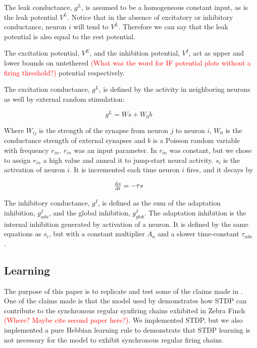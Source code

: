 \documentclass[12pt, final]{article}
\begin{document}
The leak conductance, \(g^L\), is assumed to be a homogeneous constant input, as is the leak potential \(V^L\). Notice that in the absence of excitatory or inhibitory conductance, neuron \(i\) will tend to \(V^L\). Therefore we can say that the leak potential is also equal to the rest potential.

The excitation potential, \(V^E\), and the inhibition potential, \(V^I\), act as upper and lower bounds on untethered \textcolor{red}{(What was the word for IF potential plots without a firing threshold?)} potential respectively. 

The excitation conductance, \(g^L\), is defined by the activity in neighboring neurons as well by external random stimulation:

\[g^L = Ws + W_0b\]

Where \(W_{ij}\) is the strength of the synapse from neuron \(j\) to neuron \(i\), \(W_0\) is the conductance strength of external synapses and \(b\) is a Poisson random variable with frequency \(r_{in}\). \(r_{in}\) was an input parameter. In \cite{Fiete} \(r_{in}\) was constant, but we chose to assign \(r_{in}\) a high value and anneal it to jump-start neural activity. \(s_i\) is the activation of neuron \(i\). It is incremented each time neuron \(i\) fires, and it decays by

\[\od{s}{t} = -\tau s\]

The inhibitory conductance, \(g^I\), is defined as the sum of the adaptation inhibition, \(g^I_{ada}\), and the global inhibition, \(g^I_{glob}\). The adaptation inhibition is the internal inhibition generated by activation of a neuron. It is defined by the same equations as \(s_i\), but with a constant multiplier \(A_a\) and a slower time-constant \(\tau_{ada}\).

\subsection{Learning}

The purpose of this paper is to replicate and test some of the claims made in \cite{Fiete}. One of the claims made is that the model used by \cite{Fiete} demonstrates how STDP can contribute to the synchronous regular synfiring chains exhibited in Zebra Finch \textcolor{red}{(Where? Maybe cite second paper here?)}. We implemented STDP, but we also implemented a pure Hebbian learning rule to demonstrate that STDP learning is not necessary for the model to exhibit synchronous regular firing chains.
\end{document}
